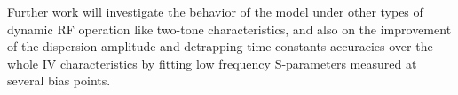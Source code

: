 \documentclass[conference]{IEEEtran}
\begin{document}
Further work will investigate the behavior of the model under other types of dynamic RF operation like two-tone characteristics, and also on the improvement of the dispersion amplitude and detrapping time constants accuracies over the whole IV characteristics by fitting low frequency S-parameters measured at several bias points.








\end{document}
